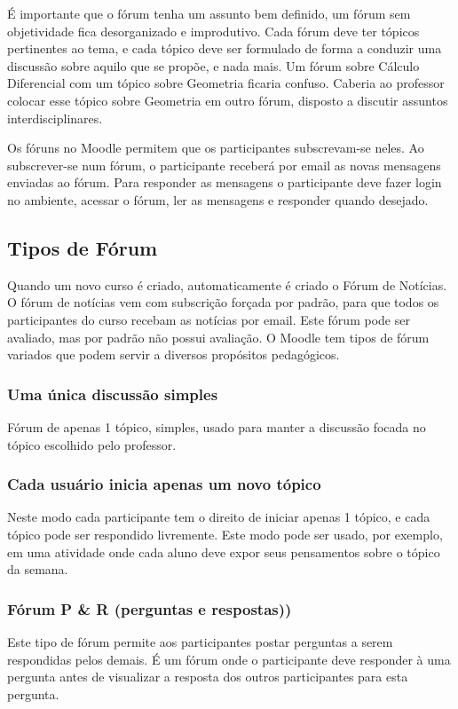 É importante que o fórum tenha um assunto bem definido, um fórum sem objetividade fica desorganizado e improdutivo. Cada fórum deve ter tópicos pertinentes ao tema, e cada tópico deve ser formulado de forma a conduzir uma discussão sobre aquilo que se propõe, e nada mais. Um fórum sobre Cálculo Diferencial com um tópico sobre Geometria ficaria confuso. Caberia ao professor colocar esse tópico sobre Geometria em outro fórum, disposto a discutir assuntos interdisciplinares.

Os fóruns no Moodle permitem que os participantes subscrevam-se neles. Ao subscrever-se num fórum, o participante receberá por email as novas mensagens enviadas ao fórum. Para responder as mensagens o participante deve fazer login no ambiente, acessar o fórum, ler as mensagens e responder quando desejado.

\subsection{Tipos de Fórum}
Quando um novo curso é criado, automaticamente é criado o Fórum de Notícias. O fórum de notícias vem com subscrição forçada por padrão, para que todos os participantes do curso recebam as notícias por email. Este fórum pode ser avaliado, mas por padrão não possui avaliação. O Moodle tem tipos de fórum variados que podem servir a diversos propósitos pedagógicos.

\subsubsection{Uma única discussão simples}
Fórum de apenas 1 tópico, simples, usado para manter a discussão focada no tópico escolhido pelo professor.
\subsubsection{Cada usuário inicia apenas um novo tópico}
Neste modo cada participante tem o direito de iniciar apenas 1 tópico, e cada tópico pode ser respondido livremente. Este modo pode ser usado, por exemplo, em uma atividade onde cada aluno deve expor seus pensamentos sobre o tópico da semana.
\subsubsection{Fórum P \& R (perguntas e respostas))}
Este tipo de fórum permite aos participantes postar perguntas a serem respondidas pelos demais. É um fórum onde o participante deve responder à uma pergunta antes de visualizar a resposta dos outros participantes para esta pergunta.
